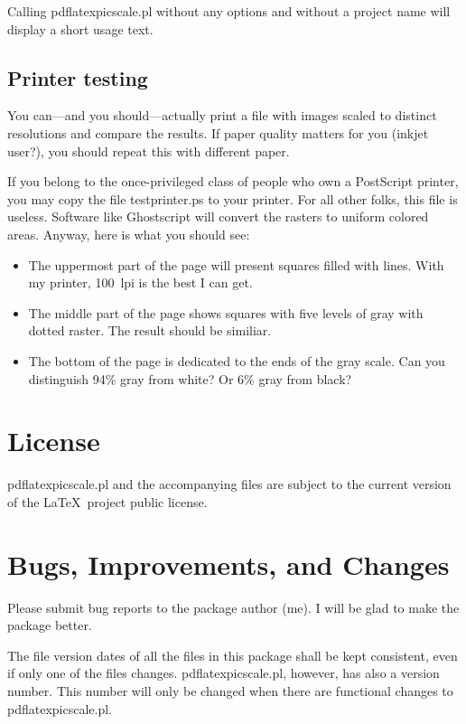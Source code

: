 \documentclass[10pt,a4paper]{article}
\begin{document}
Calling pdflatexpicscale.pl without any options and without a project name will
display a short usage text.

\subsection{Printer testing}

You can---and you should---actually print a file with images scaled to
distinct resolutions and compare the results. If paper quality matters for you
(inkjet user?), you should repeat this with different paper.

If you belong to the once-privileged class of people who own a PostScript
printer, you may copy the file testprinter.ps to your printer. For all other
folks, this file is useless. Software like Ghostscript will convert the
rasters to uniform colored areas. Anyway, here is what you should see:

\begin{itemize}
\item The uppermost part of the page will present squares filled with
  lines. With my printer, 100~lpi is the best I can get.

\item The middle part of the page shows squares with five levels of gray with
  dotted raster. The result should be similiar.

\item The bottom of the page is dedicated to the ends of the gray scale. Can
  you distinguish 94\% gray from white? Or 6\% gray from black?

\end{itemize}

\section{License}

pdflatexpicscale.pl and the accompanying files are subject to the current
version of the \LaTeX\ project public license.

\section{Bugs, Improvements, and Changes}

Please submit bug reports to the package author (me). I will be glad to make
the package better.\label{bugs}

The file version dates of all the files in this package shall be kept
consistent, even if only one of the files changes. pdflatexpicscale.pl,
however, has also a version number. This number will only be changed when
there are functional changes to pdflatexpicscale.pl. 
\end{document}
